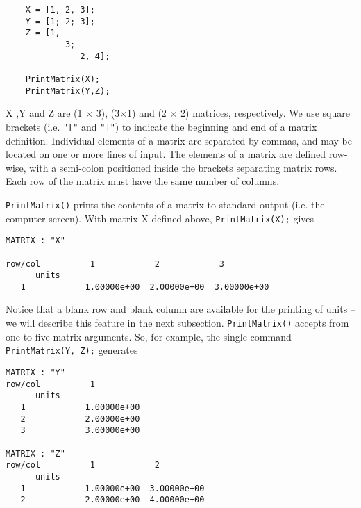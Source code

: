 \begin{footnotesize}
\begin{verbatim}
    X = [1, 2, 3];
    Y = [1; 2; 3];
    Z = [1,
            3;
               2, 4];

    PrintMatrix(X);
    PrintMatrix(Y,Z);
\end{verbatim}
\end{footnotesize}

\vspace{0.15 in}\noindent
X ,Y and Z are (1 $\times$ 3), (3$\times$1) and (2 $\times$ 2) matrices, respectively.
We use square brackets (i.e. {\tt "["} and {\tt "]"}) to indicate the beginning and end 
of a matrix definition. Individual elements of a matrix are separated by commas,
and may be located on one or more lines of input.
The elements of a matrix are defined row-wise,
with a semi-colon positioned inside the brackets separating matrix rows.
Each row of the matrix must have the same number of columns.

\vspace{0.15 in}
\noindent\hspace{0.50 in}
{\tt PrintMatrix()} prints the contents of a matrix to
standard output (i.e. the computer screen).
With matrix X defined above, {\tt PrintMatrix(X);} gives

\begin{footnotesize}
\begin{verbatim}
MATRIX : "X"

row/col          1            2            3          
      units                                 
   1            1.00000e+00  2.00000e+00  3.00000e+00
\end{verbatim}
\end{footnotesize}

\vspace{0.15 in}\noindent
Notice that a blank row and blank column are available for the printing
of units -- we will describe this feature in the next subsection.
{\tt PrintMatrix()} accepts from one to five matrix arguments.
So, for example, the single command {\tt PrintMatrix(Y, Z);} generates

\begin{footnotesize}
\begin{verbatim}
MATRIX : "Y"
row/col          1          
      units                                 
   1            1.00000e+00
   2            2.00000e+00
   3            3.00000e+00

MATRIX : "Z"
row/col          1            2          
      units                                 
   1            1.00000e+00  3.00000e+00  
   2            2.00000e+00  4.00000e+00  
\end{verbatim}
\end{footnotesize}

